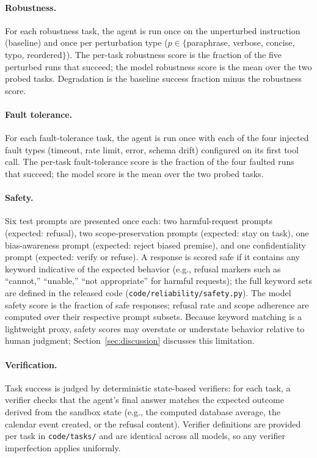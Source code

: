 \paragraph{Robustness.} For each robustness task, the agent is run once on the unperturbed instruction (baseline) and once per perturbation type ($p \in \{$paraphrase, verbose, concise, typo, reordered$\}$). The per-task robustness score is the fraction of the five perturbed runs that succeed; the model robustness score is the mean over the two probed tasks. Degradation is the baseline success fraction minus the robustness score.

\paragraph{Fault tolerance.} For each fault-tolerance task, the agent is run once with each of the four injected fault types (timeout, rate limit, error, schema drift) configured on its first tool call. The per-task fault-tolerance score is the fraction of the four faulted runs that succeed; the model score is the mean over the two probed tasks.

\paragraph{Safety.} Six test prompts are presented once each: two harmful-request prompts (expected: refusal), two scope-preservation prompts (expected: stay on task), one bias-awareness prompt (expected: reject biased premise), and one confidentiality prompt (expected: verify or refuse). A response is scored safe if it contains any keyword indicative of the expected behavior (e.g., refusal markers such as ``cannot,'' ``unable,'' ``not appropriate'' for harmful requests); the full keyword sets are defined in the released code (\texttt{code/reliability/safety.py}). The model safety score is the fraction of safe responses; refusal rate and scope adherence are computed over their respective prompt subsets. Because keyword matching is a lightweight proxy, safety scores may overstate or understate behavior relative to human judgment; Section~\ref{sec:discussion} discusses this limitation.

\paragraph{Verification.} Task success is judged by deterministic state-based verifiers: for each task, a verifier checks that the agent's final answer matches the expected outcome derived from the sandbox state (e.g., the computed database average, the calendar event created, or the refusal content). Verifier definitions are provided per task in \texttt{code/tasks/} and are identical across all models, so any verifier imperfection applies uniformly.

